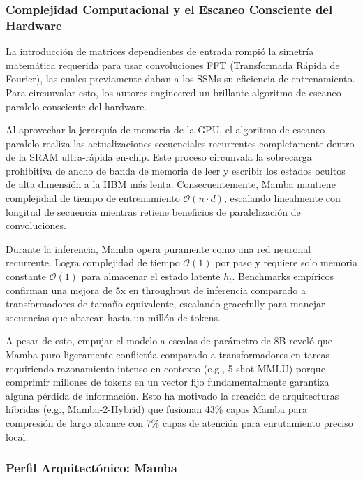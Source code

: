 \documentclass[11pt,a4paper]{article}
\begin{document}
\subsubsection{Complejidad Computacional y el Escaneo Consciente del Hardware}

La introducción de matrices dependientes de entrada rompió la simetría matemática requerida para usar convoluciones FFT (Transformada Rápida de Fourier), las cuales previamente daban a los SSMs su eficiencia de entrenamiento. Para circunvalar esto, los autores engineered un brillante algoritmo de escaneo paralelo consciente del hardware.

Al aprovechar la jerarquía de memoria de la GPU, el algoritmo de escaneo paralelo realiza las actualizaciones secuenciales recurrentes completamente dentro de la SRAM ultra-rápida en-chip. Este proceso circunvala la sobrecarga prohibitiva de ancho de banda de memoria de leer y escribir los estados ocultos de alta dimensión a la HBM más lenta. Consecuentemente, Mamba mantiene complejidad de tiempo de entrenamiento $\mathcal{O}(n \cdot d)$, escalando linealmente con longitud de secuencia mientras retiene beneficios de paralelización de convoluciones.

Durante la inferencia, Mamba opera puramente como una red neuronal recurrente. Logra complejidad de tiempo $\mathcal{O}(1)$ por paso y requiere solo memoria constante $\mathcal{O}(1)$ para almacenar el estado latente $h_t$. Benchmarks empíricos confirman una mejora de 5x en throughput de inferencia comparado a transformadores de tamaño equivalente, escalando gracefully para manejar secuencias que abarcan hasta un millón de tokens.

A pesar de esto, empujar el modelo a escalas de parámetro de 8B reveló que Mamba puro ligeramente conflictúa comparado a transformadores en tareas requiriendo razonamiento intenso en contexto (e.g., 5-shot MMLU) porque comprimir millones de tokens en un vector fijo fundamentalmente garantiza alguna pérdida de información. Esto ha motivado la creación de arquitecturas híbridas (e.g., Mamba-2-Hybrid) que fusionan 43\% capas Mamba para compresión de largo alcance con 7\% capas de atención para enrutamiento preciso local.

\subsubsection{Perfil Arquitectónico: Mamba}
\end{document}
